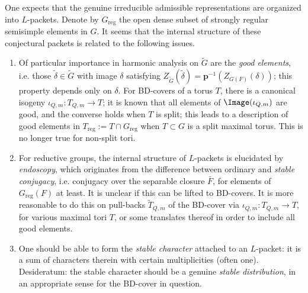 \documentclass[a4paper,10pt]{article}
\begin{document}
One expects that the genuine irreducible admissible representations are organized into $L$-packets. Denote by $G_\text{reg}$ the open dense subset of strongly regular semisimple elements in $G$. It seems that the internal structure of these conjectural packets is related to the following issues.
\begin{enumerate}[\bfseries (A)]
	\item Of particular importance in harmonic analysis on $\tilde{G}$ are the \emph{good elements}, i.e. those $\tilde{\delta} \in \tilde{G}$ with image $\delta$ satisfying $Z_{\tilde{G}}(\tilde{\delta}) = \bm{p}^{-1}\left( Z_{G(F)}(\delta) \right)$; this property depends only on $\delta$. For BD-covers of a torus $T$, there is a canonical isogeny $\iota_{Q,m}: T_{Q,m} \to T$; it is known that all elements of $\Image(\iota_{Q,m})$ are good, and the converse holds when $T$ is split; this leads to a description of good elements in $T_\text{reg} := T \cap G_\text{reg}$ when $T \subset G$ is a split maximal torus. This is no longer true for non-split tori.
	\item For reductive groups, the internal structure of $L$-packets is elucidated by \emph{endoscopy}, which originates from the difference between ordinary and \emph{stable conjugacy}, i.e. conjugacy over the separable closure $\bar{F}$, for elements of $G_\text{reg}(F)$ at least. It is unclear if this can be lifted to BD-covers. It is more reasonable to do this on pull-backs $\tilde{T}_{Q,m}$ of the BD-cover via $\iota_{Q,m}: T_{Q,m} \to T$, for various maximal tori $T$, or some translates thereof in order to include all good elements.
	\item One should be able to form the \emph{stable character} attached to an $L$-packet: it is a sum of characters therein with certain multiplicities (often one). Desideratum: the stable character should be a genuine \emph{stable distribution}, in an appropriate sense for the BD-cover in question.
\end{enumerate}
\end{document}
